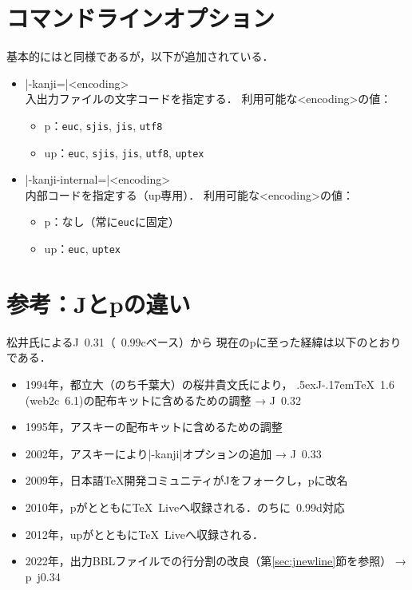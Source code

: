 \documentclass[a4paper,11pt,nomag,dvipdfmx]{jsarticle}
\def\code#1{\texttt{#1}}
\def\JTeX{\leavevmode\textcompwordmark\lower.5ex\hbox{J}\kern-.17em\TeX}
\def\JBibTeX{\leavevmode\textcompwordmark\lower.5ex\hbox{J}\kern-.08em\BibTeX}
\def\pBibTeX{p\kern-.05em\BibTeX}
\def\upBibTeX{u\pBibTeX}
\def\JBibTeX{J\BibTeX}%
\def\pBibTeX{p\BibTeX}%
\def\upBibTeX{u\pBibTeX}%
\def\TL{\TeX\ Live}
\begin{document}
\section{コマンドラインオプション}

基本的には\BibTeX と同様であるが，以下が追加されている．
\begin{itemize}
 \item |-kanji=|<encoding>\\
   入出力ファイルの文字コードを指定する．
   利用可能な<encoding>の値：
   \begin{itemize}
    \item \pBibTeX ：\code{euc}, \code{sjis}, \code{jis}, \code{utf8}
    \item \upBibTeX ：\code{euc}, \code{sjis}, \code{jis}, \code{utf8}, \code{uptex}
   \end{itemize}
 \item |-kanji-internal=|<encoding>\\
   内部コードを指定する（\upBibTeX 専用）．
   利用可能な<encoding>の値：
   \begin{itemize}
    \item \pBibTeX ：なし（常に\code{euc}に固定）
    \item \upBibTeX ：\code{euc}, \code{uptex}
   \end{itemize}
\end{itemize}


\section{参考：\JBibTeX と\pBibTeX の違い}\label{diff}

松井氏による\JBibTeX~0.31（\BibTeX~0.99cベース）から
現在の\pBibTeX に至った経緯は以下のとおりである．
\begin{itemize}
 \item 1994年，都立大（のち千葉大）の桜井貴文氏により，
   \JTeX~1.6 (web2c~6.1)の配布キットに含めるための調整 → \JBibTeX~0.32
 \item 1995年，アスキー\pTeX の配布キットに含めるための調整
 \item 2002年，アスキーにより|-kanji|オプションの追加 → \JBibTeX~0.33
 \item 2009年，日本語\TeX 開発コミュニティが\JBibTeX をフォークし，\pBibTeX に改名
 \item 2010年，\pBibTeX が\pTeX とともに\TL へ収録される．のちに\BibTeX~0.99d対応
 \item 2012年，\upBibTeX が\upTeX とともに\TL へ収録される．
 \item 2022年，出力BBLファイルでの行分割の改良（第\ref{sec:jnewline}節を参照） → \pBibTeX~j0.34
\end{itemize}
\end{document}
